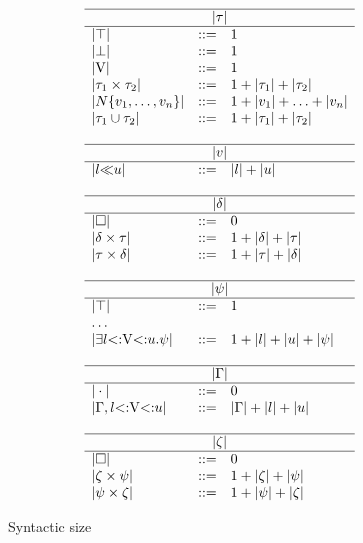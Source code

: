 \begin{figure}
\footnotesize
\[
\begin{array}{lcl}
    \hline
    \multicolumn{3}{c}{\size{\ty}} \\ 
    \hline 
    \size{\tyany} &::=& 1\\
    \size{\tybot} &::=& 1\\
    \size{\vany}  &::=& 1\\
    \size{\typair{\ty_1}{\ty_2}}  &::=& 1 + \size{\ty_1} + \size{\ty_2}\\
    \size{\tyinv\iname{\rexvar_1,\ldots,\rexvar_n}} &::=&
        1 + \size{\rexvar_1} + \ldots + \size{\rexvar_n}\\
    \size{\tyunion{\ty_1}{\ty_2}} &::=& 1 + \size{\ty_1} + \size{\ty_2}\\
    \\
    \hline
    \multicolumn{3}{c}{\size{\rexvar}} \\ 
    \hline 
    \size{\rexvarbound{\tylb}{\tyub}} &::=& \size{\tylb} + \size{\tyub}\\
    \\
    \hline
    \multicolumn{3}{c}{\size{\dctx}} \\ 
    \hline 
    \size{\square} &::=& 0\\
    \size{\typair{\dctx}{\ty}} &::=& 
        1 + \size{\dctx} + \size{\ty}\\
    \size{\typair{\ty}{\dctx}} &::=& 
        1 + \size{\ty} + \size{\dctx}\\
    \\
    \hline
    \multicolumn{3}{c}{\size{\tysig}} \\ 
    \hline 
    \size{\tyany} &::=& 1\\
    \multicolumn{3}{l}{\ldots} \\
    \size{\tyexist{\vany}{\tylb}{\tyub}{\tysig}} &::=& 
        1 + \size{\tylb} + \size{\tyub} + \size{\tysig}\\
    \\
    \hline
    \multicolumn{3}{c}{\size{\AEnv}} \\ 
    \hline 
    \size{\EmptyEnv} &::=& 0 \\
    \size{\AEnv, \varbound{\vany}{\tylb}{\tyub}} &::=& 
        \size{\AEnv} + \size{\tylb} + \size{\tyub}\\
    \\
    \hline
    \multicolumn{3}{c}{\size{\dctxsig}} \\ 
    \hline 
    \size{\square} &::=& 0\\
    \size{\typair{\dctxsig}{\tysig}} &::=& 
        1 + \size{\dctxsig} + \size{\tysig}\\
    \size{\typair{\tysig}{\dctxsig}} &::=& 
        1 + \size{\tysig} + \size{\dctxsig}\\
\end{array}
\]
\caption{Syntactic size}\label{fig:ty-size}
\end{figure}

